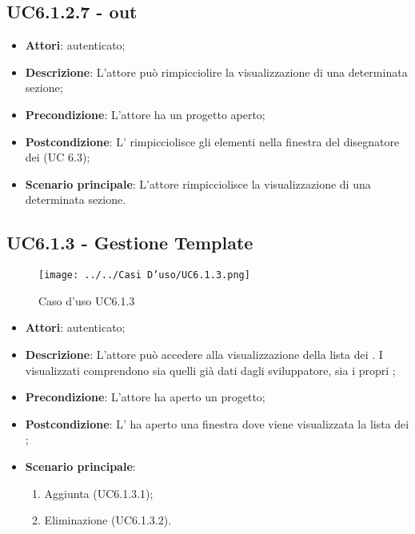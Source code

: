 \subsection{UC6.1.2.7 -  out}
\label{ssec:UC6.1.2.7}
\begin{itemize}
\item \textbf{Attori}:  autenticato;
\item \textbf{Descrizione}: L’attore può rimpicciolire la visualizzazione di una determinata sezione;
\item \textbf{Precondizione}: L’attore ha un progetto aperto;
\item \textbf{Postcondizione}: L’ rimpicciolisce gli elementi nella finestra del disegnatore dei  (UC 6.3);
\item \textbf{Scenario principale}: L'attore rimpicciolisce la visualizzazione di una determinata sezione.
\end{itemize}
\newpage
\subsection{UC6.1.3 - Gestione Template}
\label{ssec:UC6.1.3}
\begin{figure}[h!]
\centering
\texttt{[image: ../../Casi D'uso/UC6.1.3.png]}
\caption{Caso d'uso UC6.1.3}
 \end{figure}
\begin{itemize}
\item \textbf{Attori}:  autenticato;
\item \textbf{Descrizione}: L’attore può accedere alla visualizzazione della lista dei . I  visualizzati comprendono sia quelli già dati dagli sviluppatore, sia i propri ;
\item \textbf{Precondizione}: L’attore ha aperto un progetto;
\item \textbf{Postcondizione}: L' ha aperto una finestra dove viene visualizzata la lista dei ;
\item \textbf{Scenario principale}: \begin{enumerate}\item Aggiunta  (UC6.1.3.1);\item Eliminazione  (UC6.1.3.2).
 \end{enumerate}
\end{itemize}
